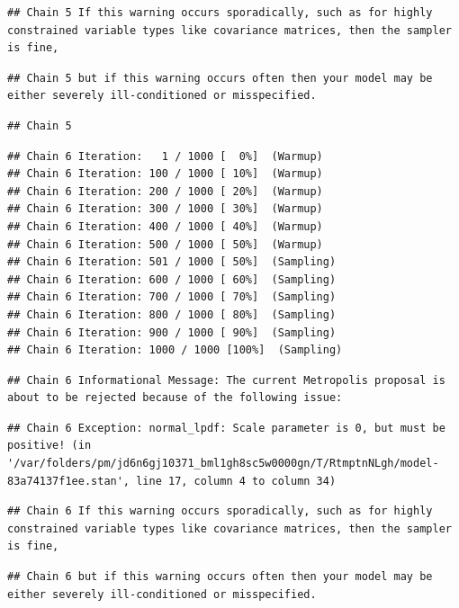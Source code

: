 \documentclass[
]{book}
\begin{document}
\begin{verbatim}
## Chain 5 If this warning occurs sporadically, such as for highly constrained variable types like covariance matrices, then the sampler is fine,
\end{verbatim}

\begin{verbatim}
## Chain 5 but if this warning occurs often then your model may be either severely ill-conditioned or misspecified.
\end{verbatim}

\begin{verbatim}
## Chain 5
\end{verbatim}

\begin{verbatim}
## Chain 6 Iteration:   1 / 1000 [  0%]  (Warmup) 
## Chain 6 Iteration: 100 / 1000 [ 10%]  (Warmup) 
## Chain 6 Iteration: 200 / 1000 [ 20%]  (Warmup) 
## Chain 6 Iteration: 300 / 1000 [ 30%]  (Warmup) 
## Chain 6 Iteration: 400 / 1000 [ 40%]  (Warmup) 
## Chain 6 Iteration: 500 / 1000 [ 50%]  (Warmup) 
## Chain 6 Iteration: 501 / 1000 [ 50%]  (Sampling) 
## Chain 6 Iteration: 600 / 1000 [ 60%]  (Sampling) 
## Chain 6 Iteration: 700 / 1000 [ 70%]  (Sampling) 
## Chain 6 Iteration: 800 / 1000 [ 80%]  (Sampling) 
## Chain 6 Iteration: 900 / 1000 [ 90%]  (Sampling) 
## Chain 6 Iteration: 1000 / 1000 [100%]  (Sampling)
\end{verbatim}

\begin{verbatim}
## Chain 6 Informational Message: The current Metropolis proposal is about to be rejected because of the following issue:
\end{verbatim}

\begin{verbatim}
## Chain 6 Exception: normal_lpdf: Scale parameter is 0, but must be positive! (in '/var/folders/pm/jd6n6gj10371_bml1gh8sc5w0000gn/T/RtmptnNLgh/model-83a74137f1ee.stan', line 17, column 4 to column 34)
\end{verbatim}

\begin{verbatim}
## Chain 6 If this warning occurs sporadically, such as for highly constrained variable types like covariance matrices, then the sampler is fine,
\end{verbatim}

\begin{verbatim}
## Chain 6 but if this warning occurs often then your model may be either severely ill-conditioned or misspecified.
\end{verbatim}
\end{document}
